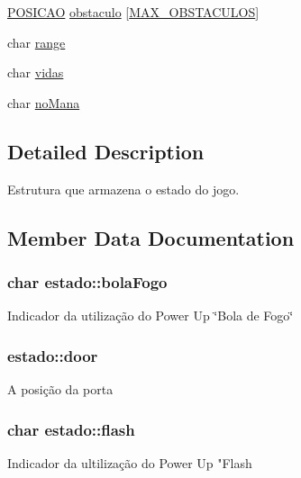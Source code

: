 \begin{DoxyCompactItemize}
\item 
\hyperlink{estado_8h_a55b3f4b56938eeb8fa5e8f9c07baf1b0}{P\+O\+S\+I\+C\+AO} \hyperlink{structestado_a970dc20c6687acb17c3f08c06edbed4f}{obstaculo} \mbox{[}\hyperlink{estado_8h_ac574e2817856ecc9a890d2d47cb9d783}{M\+A\+X\+\_\+\+O\+B\+S\+T\+A\+C\+U\+L\+OS}\mbox{]}
\item 
char \hyperlink{structestado_a813cb0f2927179b6139566f846c77018}{range}
\item 
char \hyperlink{structestado_a1dcd7329b4a4cd561a7b72b2552f1d6c}{vidas}
\item 
char \hyperlink{structestado_a4b38ac23d32fda340afb2b57bfdcc2c4}{no\+Mana}
\end{DoxyCompactItemize}


\subsection{Detailed Description}
Estrutura que armazena o estado do jogo. 

\subsection{Member Data Documentation}
\subsubsection[{\texorpdfstring{bola\+Fogo}{bolaFogo}}]{\setlength{\rightskip}{0pt plus 5cm}char estado\+::bola\+Fogo}\hypertarget{structestado_ab2fb851219c49552677f99c5759797ed}{}\label{structestado_ab2fb851219c49552677f99c5759797ed}
Indicador da utilização do Power Up \char`\"{}\+Bola de Fogo\char`\"{} 
\subsubsection[{\texorpdfstring{door}{door}}]{ estado\+::door}\hypertarget{structestado_a7415ebf0dc1fbc535407bb2bd669dc81}{}\label{structestado_a7415ebf0dc1fbc535407bb2bd669dc81}
A posição da porta 
\subsubsection[{\texorpdfstring{flash}{flash}}]{\setlength{\rightskip}{0pt plus 5cm}char estado\+::flash}\hypertarget{structestado_aabc94c34319b0500ee6eb353f35c9caa}{}\label{structestado_aabc94c34319b0500ee6eb353f35c9caa}
Indicador da ultilização do Power Up "Flash 
